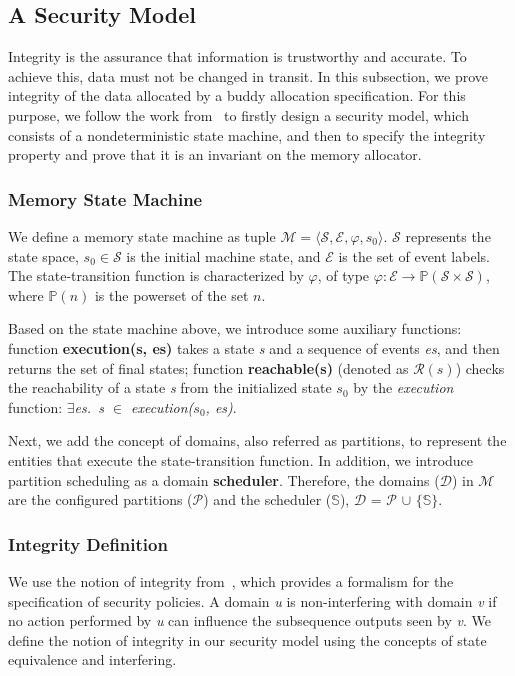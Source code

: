 \subsection{A Security Model}\label{sec:securitymodel}
Integrity is the assurance that information is trustworthy and accurate. To achieve this, data must not be changed in transit. In this subsection, we prove integrity of the data allocated by a buddy allocation specification. For this purpose, we follow the work from~\cite{reg_securitymodel} to firstly design a security model, which consists of a nondeterministic state machine, and then to specify the integrity property and prove that it is an invariant on the memory allocator.

\subsubsection{Memory State Machine}
We define a memory state machine as tuple $\mathcal{M} = \langle \mathcal{S}, \mathcal{E}, \varphi, s_0 \rangle$. $\mathcal{S}$ represents the state space,  $s_0 \in \mathcal{S}$ is the initial machine state, and $\mathcal{E}$ is the set of event labels. The state-transition function is characterized by $\varphi$, of type $\varphi: \mathcal{E} \rightarrow \mathbb{P}(\mathcal{S} \times \mathcal{S})$, where $\mathbb{P}(n)$ is the powerset of the set $n$.

Based on the state machine above, we introduce some auxiliary functions: function \textbf{execution(s, es)} takes a state \emph{s} and a sequence of events \emph{es}, and then returns the set of final states; function \textbf{reachable(s)} (denoted as $\mathcal{R}(s)$) checks the reachability of a state \emph{s} from the initialized state $s_0$ by the \emph{execution} function: \emph{$\exists$es.\ s $\in$ execution($s_0$, es)}.

Next, we add the concept of domains, also referred as partitions, to represent the entities that execute the state-transition function. In addition, we introduce partition scheduling as a domain \textbf{scheduler}. Therefore, the domains ($\mathcal{D}$) in $\mathcal{M}$ are the configured partitions ($\mathcal{P}$) and the scheduler ($\mathbb{S}$), $\mathcal{D}$ = $\mathcal{P}$ $\cup$ $\lbrace$$\mathbb{S}$$\rbrace$.

\subsubsection{Integrity Definition}
We use the notion of integrity from~\cite{reg_noninterference}, which provides a formalism for the specification of security policies. A domain \emph{u} is non-interfering with domain \emph{v} if no action performed by \emph{u} can influence the subsequence outputs seen by \emph{v}. We define the notion of integrity in our security model using the concepts of state equivalence and interfering.

